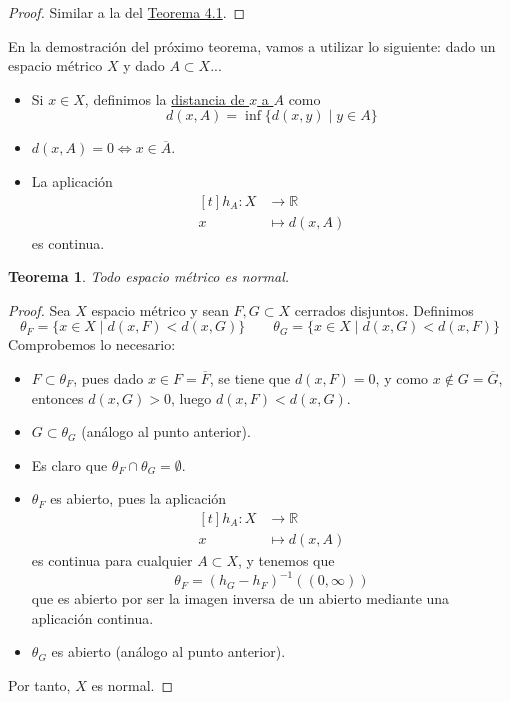 \documentclass[12pt]{report}
\newtheorem{theorem}{Teorema}[chapter]
\theoremstyle{definition}
\theoremstyle{definition}
\theoremstyle{remark}
\newcommand{\R}{\mathbb R}
\begin{document}
\begin{proof}
Similar a la del \hyperref[teo4.1.]{\color{blue}Teorema 4.1}.
\end{proof}

En la demostración del próximo teorema, vamos a utilizar lo siguiente: dado un espacio métrico $X$ y dado $A \subset X$...
\begin{itemize}
    \item Si $x \in X$, definimos la \underline{distancia de $x$ a $A$} como
    \[d(x,A) = \inf{\{d(x,y) \mid y \in A\}}\]
    \item $d(x,A) = 0 \iff x \in \overline{A}$.
    \item La aplicación
    \[
    \begin{aligned}[t]
        h_A \colon X & \longrightarrow \R \\
        x & \longmapsto d(x,A)
    \end{aligned}
    \]
    es continua.
\end{itemize}

\begin{theorem}
Todo espacio métrico es normal.
\end{theorem}

\begin{proof}
Sea $X$ espacio métrico y sean $F,G \subset X$ cerrados disjuntos. Definimos
\[\theta_F = \{x \in X \mid d(x,F) < d(x,G)\} \qquad \theta_G = \{x \in X \mid d(x,G) < d(x,F)\}\]
Comprobemos lo necesario:
\begin{itemize}
    \item $F \subset \theta_F$, pues dado $x \in F = \overline{F}$, se tiene que $d(x,F) = 0$, y como $x \notin G = \overline{G}$, entonces $d(x,G) > 0$, luego $d(x,F) < d(x,G)$.
    \item $G \subset \theta_G$ (análogo al punto anterior).
    \item Es claro que $\theta_F \cap \theta_G = \emptyset$.
    \item $\theta_F$ es abierto, pues la aplicación
        \[
        \begin{aligned}[t]
            h_A \colon X & \longrightarrow \R \\
            x & \longmapsto d(x,A)
        \end{aligned}
        \]
    es continua para cualquier $A \subset X$, y tenemos que
    \[\theta_F = (h_G - h_F)^{-1}((0,\infty))\]
    que es abierto por ser la imagen inversa de un abierto mediante una aplicación continua.
    \item $\theta_G$ es abierto (análogo al punto anterior).
\end{itemize}
Por tanto, $X$ es normal.
\end{proof}
\end{document}
